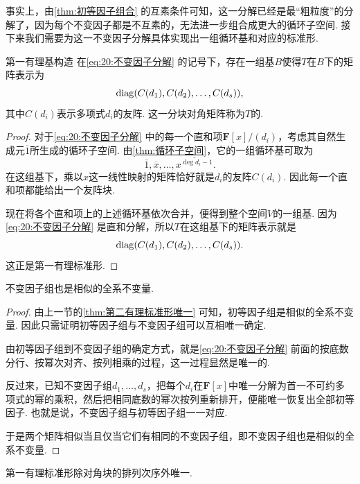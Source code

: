 事实上，由\autoref{thm:初等因子组合} 的互素条件可知，这一分解已经是最``粗粒度''的分解了，因为每个不变因子都是不互素的，无法进一步组合成更大的循环子空间. 接下来我们需要为这一不变因子分解具体实现出一组循环基和对应的标准形.

\begin{theorem}{}{第一有理基构造}
    在\autoref{eq:20:不变因子分解} 的记号下，存在一组基$B$使得$T$在$B$下的矩阵表示为
    \[
        \operatorname{diag}(C(d_1),C(d_2),\ldots,C(d_s)),
    \]
    其中$C(d_i)$表示多项式$d_i$的友阵. 这一分块对角矩阵称为$T$的.
\end{theorem}
\begin{proof}
    对于\autoref{eq:20:不变因子分解} 中的每一个直和项$\mathbf{F}[x]/(d_i)$，考虑其自然生成元$\overline{1}$所生成的循环子空间. 由\autoref{thm:循环子空间}，它的一组循环基可取为
    \[
        \overline{1},\overline{x},\ldots,\overline{x^{\deg d_i-1}}.
    \]
    在这组基下，乘以$x$这一线性映射的矩阵恰好就是$d_i$的友阵$C(d_i)$. 因此每一个直和项都能给出一个友阵块.

    现在将各个直和项上的上述循环基依次合并，便得到整个空间$V$的一组基. 因为\autoref{eq:20:不变因子分解} 是直和分解，所以$T$在这组基下的矩阵表示就是
    \[
        \operatorname{diag}(C(d_1),C(d_2),\ldots,C(d_s)).
    \]
    这正是第一有理标准形.
\end{proof}

\begin{theorem}{}{}
    不变因子组也是相似的全系不变量.
\end{theorem}
\begin{proof}
    由上一节的\autoref{thm:第二有理标准形唯一} 可知，初等因子组是相似的全系不变量. 因此只需证明初等因子组与不变因子组可以互相唯一确定.

    由初等因子组到不变因子组的确定方式，就是\autoref{eq:20:不变因子分解} 前面的按底数分行、按幂次对齐、按列相乘的过程，这一过程显然是唯一的.

    反过来，已知不变因子组$d_1,\ldots,d_s$，把每个$d_i$在$\mathbf{F}[x]$中唯一分解为首一不可约多项式的幂的乘积，然后把相同底数的幂次按列重新排开，便能唯一恢复出全部初等因子. 也就是说，不变因子组与初等因子组一一对应.

    于是两个矩阵相似当且仅当它们有相同的不变因子组，即不变因子组也是相似的全系不变量.
\end{proof}

\begin{corollary}{}{}
    第一有理标准形除对角块的排列次序外唯一.
\end{corollary}

\begin{summary}

\end{summary}

\begin{exercise}

    \begin{exgroup}
        \item
    \end{exgroup}

    \begin{exgroup}
        \item
    \end{exgroup}

    \begin{exgroup}
        \item
    \end{exgroup}
\end{exercise}
